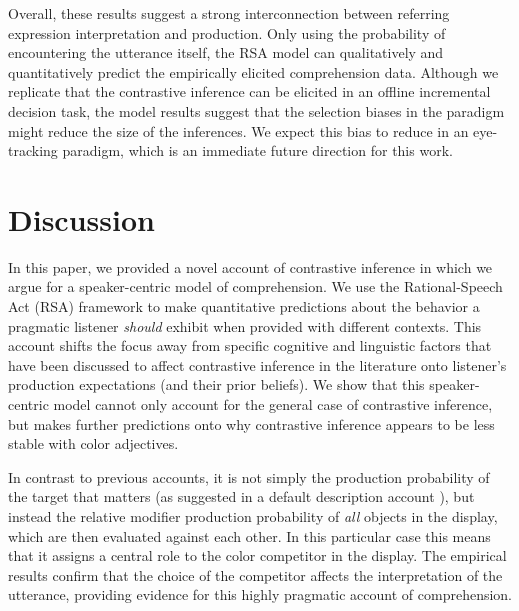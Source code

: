 \documentclass[10pt,letterpaper]{article}
\newcommand{\ek}[1]{\textcolor{Orange}{[ek: #1]}}
\begin{document}

Overall, these results suggest a strong interconnection between referring expression interpretation and production. Only using the probability of encountering the utterance itself, the RSA model can qualitatively and quantitatively predict the empirically elicited comprehension data. Although we replicate that the contrastive inference can be elicited in an offline incremental decision task, the model results suggest that the selection biases in the paradigm might reduce the size of the inferences. We expect this bias to reduce in an eye-tracking paradigm, which is an immediate future direction for this work.


\section{Discussion}

In this paper, we provided a novel account of contrastive inference in which we argue for a speaker-centric model of comprehension. We use the Rational-Speech Act (RSA) framework to make quantitative predictions about the behavior a pragmatic listener \textit{should} exhibit when provided with different contexts. This account shifts the focus away from specific cognitive and linguistic factors that have been discussed to affect contrastive inference in the literature onto listener's production expectations (and their prior beliefs). We show that this speaker-centric model cannot only account for the general case of contrastive inference, but makes further predictions onto why contrastive inference appears to be less stable with color adjectives. 

In contrast to previous accounts, it is not simply the production probability of the target that matters (as suggested in a default description account \cite{Sedivy:2003}), but instead the relative modifier production probability of \emph{all} objects in the display, which are then evaluated against each other. In this particular case this means that it assigns a central role to the color competitor in the display. The empirical results confirm that the choice of the competitor affects the interpretation of the utterance, providing evidence for this highly pragmatic account of comprehension.
\end{document}
